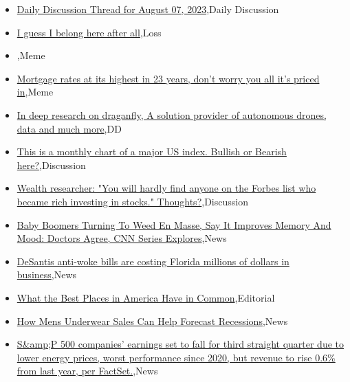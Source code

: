 \documentclass{article}%
\begin{document}
%
\begin{itemize}%
\item%
\href{https://reddit.com/r/wallstreetbets/comments/15kg8kv/daily\_discussion\_thread\_for\_august\_07\_2023/}{Daily Discussion Thread for August 07, 2023},Daily Discussion%
\item%
\href{https://reddit.com/r/wallstreetbets/comments/15kaqyl/i\_guess\_i\_belong\_here\_after\_all/}{I guess I belong here after all},Loss%
\item%
\href{https://reddit.com/r/wallstreetbets/comments/15kansm/\_/}{},Meme%
\item%
\href{https://reddit.com/r/wallstreetbets/comments/15k33aj/mortgage\_rates\_at\_its\_highest\_in\_23\_years\_dont/}{Mortgage rates at its highest in 23 years, don't worry you all it's priced in},Meme%
\item%
\href{https://reddit.com/r/Baystreetbets/comments/15js6zw/in\_deep\_research\_on\_draganfly\_a\_solution\_provider/}{In deep research on draganfly, A solution provider of autonomous drones, data and much more},DD%
\item%
\href{https://reddit.com/r/StockMarket/comments/15jz555/this\_is\_a\_monthly\_chart\_of\_a\_major\_us\_index/}{This is a monthly chart of a major US index. Bullish or Bearish here?},Discussion%
\item%
\href{https://reddit.com/r/StockMarket/comments/15jwuax/wealth\_researcher\_you\_will\_hardly\_find\_anyone\_on/}{Wealth researcher: "You will hardly find anyone on the Forbes list who became rich investing in stocks." Thoughts?},Discussion%
\item%
\href{https://reddit.com/r/Economics/comments/15kgxad/baby\_boomers\_turning\_to\_weed\_en\_masse\_say\_it/}{Baby Boomers Turning To Weed En Masse, Say It Improves Memory And Mood: Doctors Agree, CNN Series Explores},News%
\item%
\href{https://reddit.com/r/Economics/comments/15kg3ee/desantis\_antiwoke\_bills\_are\_costing\_florida/}{DeSantis anti-woke bills are costing Florida millions of dollars in business},News%
\item%
\href{https://reddit.com/r/Economics/comments/15jxal8/what\_the\_best\_places\_in\_america\_have\_in\_common/}{What the Best Places in America Have in Common},Editorial%
\item%
\href{https://reddit.com/r/Economics/comments/15jwin1/how\_mens\_underwear\_sales\_can\_help\_forecast/}{How Mens Underwear Sales Can Help Forecast Recessions},News%
\item%
\href{https://reddit.com/r/Economics/comments/15jvnj1/sp\_500\_companies\_earnings\_set\_to\_fall\_for\_third/}{S\&amp;P 500 companies' earnings set to fall for third straight quarter due to lower energy prices, worst performance since 2020, but revenue to rise 0.6\% from last year, per FactSet.},News%
\end{itemize}%
\end{document}
